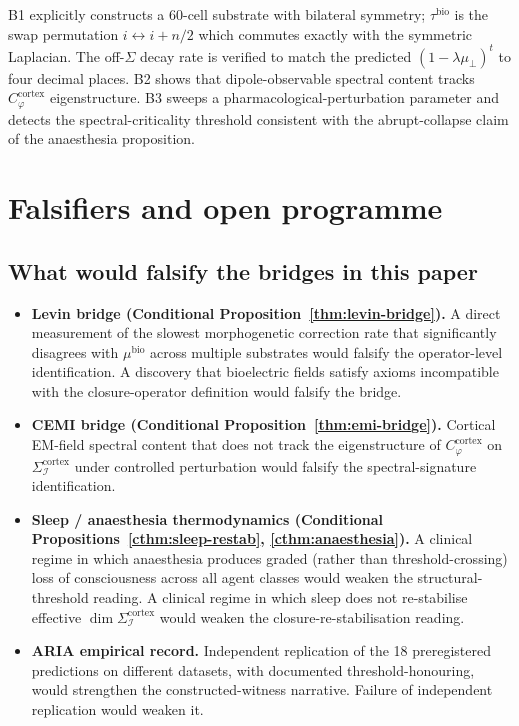 \documentclass[11pt]{article}
\theoremstyle{plain}
\theoremstyle{definition}
\theoremstyle{remark}
\newcommand{\Ical}{\mathcal{I}}
\newcommand{\Cph}{C_\varphi}
\begin{document}
B1 explicitly constructs a 60-cell substrate with bilateral symmetry; $\tau^{\mathrm{bio}}$ is the swap permutation $i \leftrightarrow i + n/2$ which commutes exactly with the symmetric Laplacian. The off-$\Sigma$ decay rate is verified to match the predicted $(1 - \lambda \mu_\perp)^t$ to four decimal places. B2 shows that dipole-observable spectral content tracks $\Cph^{\mathrm{cortex}}$ eigenstructure. B3 sweeps a pharmacological-perturbation parameter and detects the spectral-criticality threshold consistent with the abrupt-collapse claim of the anaesthesia proposition.

\section{Falsifiers and open programme}\label{sec:falsifiers}

\subsection{What would falsify the bridges in this paper}

\begin{itemize}[leftmargin=2em]
\item \textbf{Levin bridge (Conditional Proposition~\ref{thm:levin-bridge}).} A direct measurement of the slowest morphogenetic correction rate that significantly disagrees with $\mu^{\mathrm{bio}}$ across multiple substrates would falsify the operator-level identification. A discovery that bioelectric fields satisfy axioms incompatible with the closure-operator definition would falsify the bridge.
\item \textbf{CEMI bridge (Conditional Proposition~\ref{thm:emi-bridge}).} Cortical EM-field spectral content that does not track the eigenstructure of $\Cph^{\mathrm{cortex}}$ on $\Sigma_\Ical^{\mathrm{cortex}}$ under controlled perturbation would falsify the spectral-signature identification.
\item \textbf{Sleep / anaesthesia thermodynamics (Conditional Propositions~\ref{cthm:sleep-restab}, \ref{cthm:anaesthesia}).} A clinical regime in which anaesthesia produces graded (rather than threshold-crossing) loss of consciousness across all agent classes would weaken the structural-threshold reading. A clinical regime in which sleep does not re-stabilise effective $\dim \Sigma_\Ical^{\mathrm{cortex}}$ would weaken the closure-re-stabilisation reading.
\item \textbf{ARIA empirical record.} Independent replication of the 18 preregistered predictions on different datasets, with documented threshold-honouring, would strengthen the constructed-witness narrative. Failure of independent replication would weaken it.
\end{itemize}
\end{document}
